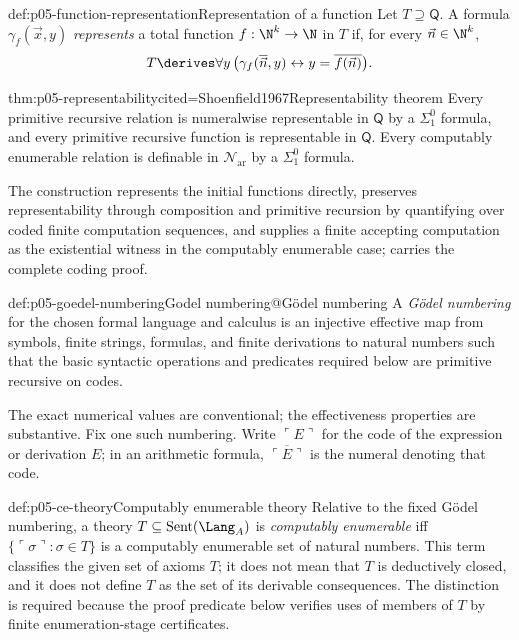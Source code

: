 \begin{hbdefinition}{def:p05-function-representation}{Representation of a function}
Let \(T\supseteq\mathsf Q\).  A formula \(\gamma_f(\vec x,y)\)
\emph{represents} a total function \(f:\N^k\to\N\) in \(T\) if, for every
\(\vec n\in\N^k\),
\[
  T\derives\forall y\,
  \bigl(\gamma_f(\overline{\vec n},y)
  \leftrightarrow y=\overline{f(\vec n)}\bigr).
\]
\end{hbdefinition}

\begin{hbtheorem}{thm:p05-representability}{cited=Shoenfield1967}{Representability theorem}
Every primitive recursive relation is numeralwise representable in
\(\mathsf Q\) by a \(\Sigma^0_1\) formula, and every primitive recursive
function is representable in \(\mathsf Q\).  Every computably enumerable
relation is definable in \(\mathcal N_{\mathrm{ar}}\) by a \(\Sigma^0_1\) formula.
\end{hbtheorem}

The construction represents the initial functions directly, preserves
representability through composition and primitive recursion by
quantifying over coded finite computation sequences, and supplies a
finite accepting computation as the existential witness in the computably
enumerable case; \cite{Shoenfield1967} carries the complete coding proof.

\begin{hbdefinition}{def:p05-goedel-numbering}{Godel numbering@G\"odel numbering}
A \emph{G\"odel numbering} for the chosen formal language and calculus is
an injective effective map from symbols, finite strings, formulas, and
finite derivations to natural numbers such that the basic syntactic
operations and predicates required below are primitive recursive on
codes.
\end{hbdefinition}

The exact numerical values are conventional; the effectiveness properties
are substantive.  Fix one such numbering.  Write \(\ulcorner E\urcorner\)
for the code of the expression or derivation \(E\); in an arithmetic
formula, \(\overline{\ulcorner E\urcorner}\) is the numeral denoting that
code.

\begin{hbdefinition}{def:p05-ce-theory}{Computably enumerable theory}
Relative to the fixed G\"odel numbering, a theory
\(T\subseteq\mathrm{Sent}(\Lang_A)\) is \emph{computably enumerable} iff
\(\{\ulcorner\sigma\urcorner:\sigma\in T\}\) is a computably enumerable
set of natural numbers.  This term classifies the given set of axioms
\(T\); it does not mean that \(T\) is deductively closed, and it does not
define \(T\) as the set of its derivable consequences.  The distinction
is required because the proof predicate below verifies uses of members of
\(T\) by finite enumeration-stage certificates.
\end{hbdefinition}

